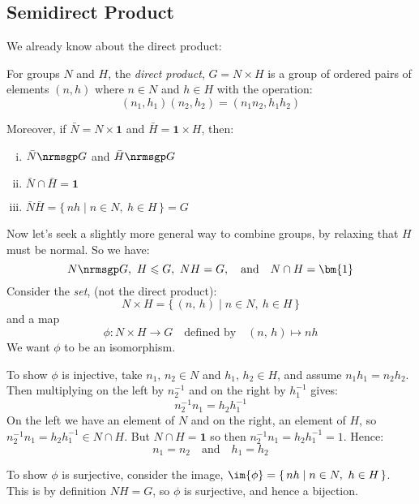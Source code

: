 \subsection{Semidirect Product}
We already know about the direct product:

\begin{definition}
    For groups \(N\) and \(H\), the \emph{direct product}, \(G = N\times H\) is a group of ordered pairs of elements
    \((n, h)\) where \(n \in N\) and \(h \in H\) with the operation:
    \[(n_1, h_1)(n_2, h_2) = (n_1n_2, h_1h_2)\]

    Moreover, if \(\bar{N} = N \times \bm{1}\) and \(\bar{H} = \bm{1} \times H\), then:
    \begin{enumerate}[(i)]
        \item \(\bar{N} \nrmsgp G\) and \(\bar{H} \nrmsgp G\)
        \item \(\bar{N} \cap \bar{H} = \bm{1}\)
        \item \(\bar{N}\bar{H} = \{\,nh \mid n \in N,\ h \in H\,\} = G\)
    \end{enumerate}
\end{definition}

Now let's seek a slightly more general way to combine groups, by relaxing that \(H\) must be normal.
So we have:
\[N \nrmsgp G,\ H \leqslant G,\ NH = G, \quad \text{and} \quad N \cap H = \bm{1}\]
Consider the \emph{set}, (not the direct product):
\[N \times H = \{\,(n,\,h) \mid n \in N,\ h \in H\,\}\]
and a map
\[\phi:N \times H \to G \quad \text{defined by} \quad (n,\, h) \mapsto nh\]
We want \(\phi\) to be an isomorphism.

To show \(\phi\) is injective, take \(n_1,\, n_2 \in N\) and \(h_1,\, h_2 \in H\), and assume \(n_1 h_1 = n_2 h_2\).
Then multiplying on the left by \(n_2^{-1}\) and on the right by \(h_1^{-1}\) gives:
\[n_2^{-1} n_1 = h_2 h_1^{-1}\]
On the left we have an element of \(N\) and on the right, an element of \(H\), so \(n_2^{-1} n_1 = h_2 h_1^{-1} \in N
\cap H\).
But \(N \cap H = \bm{1}\) so then \(n_2^{-1} n_1 = h_2 h_1^{-1} = 1\).
Hence:
\[n_1 = n_2 \quad \text{and} \quad h_1 = h_2\]

To show \(\phi\) is surjective, consider the image, \(\im{\phi} = \{\,nh \mid n \in N,\ h \in H\,\}\).
This is by definition \(NH = G\), so \(\phi\) is surjective, and hence a bijection.

